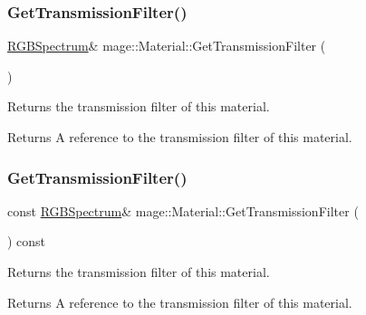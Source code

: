 \subsubsection{\texorpdfstring{Get\+Transmission\+Filter()}{GetTransmissionFilter()}\hspace{0.1cm}{\footnotesize\ttfamily [1/2]}}
{\footnotesize\ttfamily \hyperlink{structmage_1_1_r_g_b_spectrum}{R\+G\+B\+Spectrum}\& mage\+::\+Material\+::\+Get\+Transmission\+Filter (\begin{DoxyParamCaption}{ }\end{DoxyParamCaption})\hspace{0.3cm}{\ttfamily [noexcept]}}

Returns the transmission filter of this material.

\begin{DoxyReturn}{Returns}
A reference to the transmission filter of this material. 
\end{DoxyReturn}
\hypertarget{structmage_1_1_material_a38071483e6d47eedb02b2e5c912073e7}{}\label{structmage_1_1_material_a38071483e6d47eedb02b2e5c912073e7} 
\subsubsection{\texorpdfstring{Get\+Transmission\+Filter()}{GetTransmissionFilter()}\hspace{0.1cm}{\footnotesize\ttfamily [2/2]}}
{\footnotesize\ttfamily const \hyperlink{structmage_1_1_r_g_b_spectrum}{R\+G\+B\+Spectrum}\& mage\+::\+Material\+::\+Get\+Transmission\+Filter (\begin{DoxyParamCaption}{ }\end{DoxyParamCaption}) const\hspace{0.3cm}{\ttfamily [noexcept]}}

Returns the transmission filter of this material.

\begin{DoxyReturn}{Returns}
A reference to the transmission filter of this material. 
\end{DoxyReturn}
\hypertarget{structmage_1_1_material_a7ebc9986924ca13ae8468005518dcfc7}{}\label{structmage_1_1_material_a7ebc9986924ca13ae8468005518dcfc7} 
